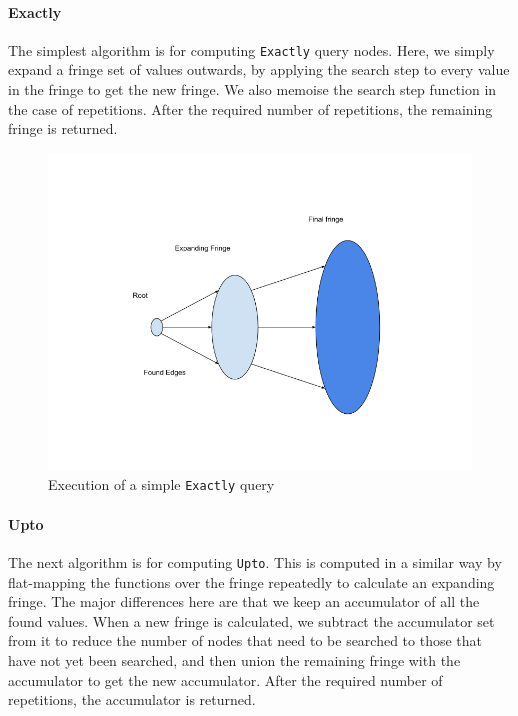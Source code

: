 \documentclass[12pt,a4paper,twoside,openright]{report}
\newcommand\codeName[1]{\texttt{#1}}
\begin{document}
		\paragraph{Exactly}
The simplest algorithm is for computing \codeName{Exactly} query nodes. Here, we simply expand a fringe set of values outwards, by applying the search step to every value in the fringe to get the new fringe. We also memoise the search step function in the case of repetitions. After the required number of repetitions, the remaining fringe is returned.

\begin{figure}[ht]
\centering
  \includegraphics[width=\textwidth]{figs/Exactly.png}
  \caption{Execution of a simple \codeName{Exactly} query}
  \label{fig:ExactlySingle}
\end{figure}
    		\paragraph{Upto}
The next algorithm is for computing \codeName{Upto}. This is computed in a similar way by flat-mapping the functions over the fringe repeatedly to calculate an expanding fringe. The major differences here are that we keep an accumulator of all the found values. When a new fringe is calculated, we subtract the accumulator set from it to reduce the number of nodes that need to be searched to those that have not yet been searched, and then union the remaining fringe with the accumulator to get the new accumulator. After the required number of repetitions, the accumulator is returned.
\end{document}
